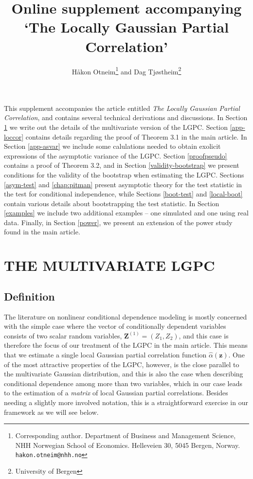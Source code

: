 \documentclass[
  12pt,
  letterpaper]{article}
\title{Online supplement accompanying `The Locally Gaussian Partial Correlation'}
\author{Håkon Otneim\footnote{Corresponding author. Department of Business and Management Science, NHH Norwegian School of Economics. Helleveien 30, 5045 Bergen, Norway. \texttt{hakon.otneim@nhh.no}} and Dag Tjøstheim\footnote{University of Bergen}}
\date{}
\numberwithin{equation}{section}
\newcommand{\z}{\bm{z}}
\newcommand{\Zone}{\bm{Z}^{(1)}}
\begin{document}
\maketitle

This supplement accompanies the article entitled \emph{The Locally Gaussian Partial Correlation}, and contains several technical derivations and discussions. In Section \ref{multi} we write out the details of the multivariate version of the LGPC. Section \ref{app-loccor} contains details regarding the proof of Theorem 3.1 in the main article. In Section \ref{app-asvar} we include some calulations needed to obtain exolicit expressions of the asymptotic variance of the LGPC. Section \ref{proofpseudo} contains a proof of Theorem 3.2, and in Section \ref{validity-bootstrap} we present conditions for the validity of the bootstrap when estimating the LGPC. Sections \ref{asym-test} and \ref{chap:pitman} present asymptotic theory for the test statistic in the test for conditional independence, while Sections \ref{boot-test} and \ref{local-boot} contain various details about bootstrapping the test statistic. In Section \ref{examples} we include two additional examples -- one simulated and one using real data. Finally, in Section \ref{power}, we present an extension of the power study found in the main article.

\hypertarget{multi}{%
\section{THE MULTIVARIATE LGPC}\label{multi}}

\hypertarget{definition}{%
\subsection{Definition}\label{definition}}

The literature on nonlinear conditional dependence modeling is mostly concerned with the simple case where the vector of conditionally dependent variables consists of two scalar random variables, \(\Zone = (Z_1, Z_2)\), and this case is therefore the focus of our treatment of the LGPC in the main article. This means that we estimate a single local Gaussian partial correlation function \(\widehat \alpha(\z)\). One of the most attractive properties of the LGPC, however, is the close parallel to the multivariate Gaussian distribution, and this is also the case when describing conditional dependence among more than two variables, which in our case leads to the estimation of a \emph{matrix} of local Gaussian partial correlations. Besides needing a slightly more involved notation, this is a straightforward exercise in our framework as we will see below.
\end{document}
